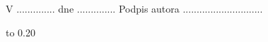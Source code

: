 \vspace{1cm}

\noindent
V .............. dne .............. \hfill Podpis autora .............................

\newpage

\openright

\vbox to 0.20

\newpage

\openright


